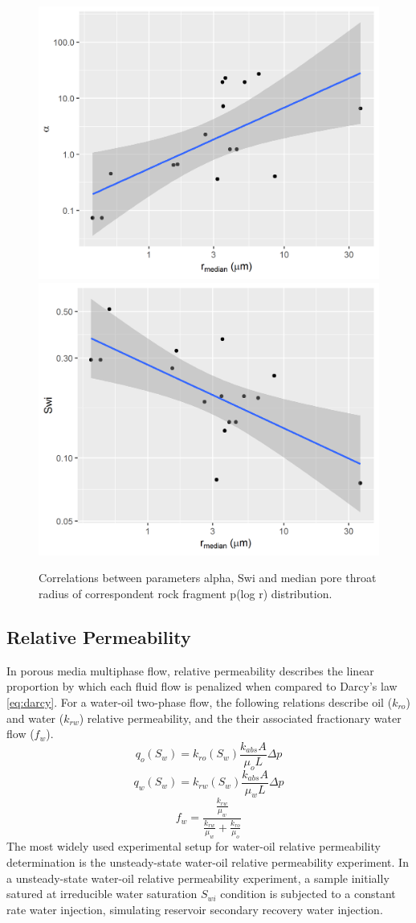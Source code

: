 \documentclass[english,msc,numbers]{coppe}
\begin{document}
  \begin{figure}
  
  {\centering \includegraphics[width=0.45\linewidth]{figure/2-12a-correlations-pchg} \includegraphics[width=0.45\linewidth]{figure/2-12b-correlations-pchg} 
  
  }
  
  \caption{Correlations between parameters alpha, Swi and median pore throat radius of correspondent rock fragment p(log r) distribution.}\label{fig:pchg-correlations}
  \end{figure}
  \hypertarget{relative-permeability}{%
  \subsection{Relative Permeability}\label{relative-permeability}}
  
  In porous media multiphase flow, relative permeability describes the linear proportion by which each fluid flow is penalized when compared to Darcy's law \eqref{eq:darcy}. For a water-oil two-phase flow, the following relations describe oil (\(k_{ro}\)) and water (\(k_{rw}\)) relative permeability, and the their associated fractionary water flow (\(f_{w}\)).
  \begin{equation} 
    q_o(S_w) = k_{ro}(S_w) \frac{k_{abs}A}{\mu_o L} \Delta p
    \label{eq:kro}
  \end{equation}
  \begin{equation} 
    q_w(S_w) = k_{rw}(S_w) \frac{k_{abs}A}{\mu_w L} \Delta p
    \label{eq:krw}
  \end{equation}
  \begin{equation} 
    f_w = \frac{\frac{k_{rw}}{\mu_w}}{\frac{k_{rw}}{\mu_w} + \frac{k_{ro}}{\mu_o}}
    \label{eq:fw}
  \end{equation}
  The most widely used experimental setup for water-oil relative permeability determination is the unsteady-state water-oil relative permeability experiment. In a unsteady-state water-oil relative permeability experiment, a sample initially satured at irreducible water saturation \(S_{wi}\) condition is subjected to a constant rate water injection, simulating reservoir secondary recovery water injection.
  
\end{document}
